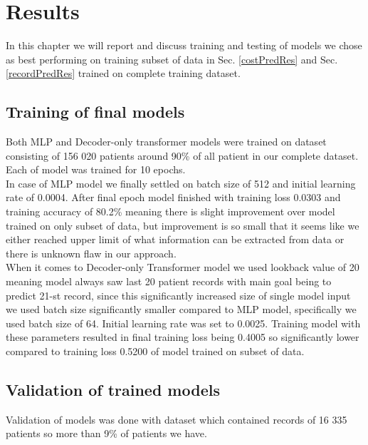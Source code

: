 
\chapter{Results} \label{chap:results}

In this chapter we will report and discuss training and testing of models we chose as best performing on training subset of data in Sec. \ref{costPredRes} and Sec. \ref{recordPredRes} trained on complete training dataset.
\\

\section{Training of final models}
\label{modelTrain}

Both MLP and Decoder-only transformer models were trained on dataset consisting of 156 020 patients around 90\% of all patient in our complete dataset. Each of model was trained for 10 epochs. 
\\

In case of MLP model we finally settled on batch size of 512 and initial learning rate of 0.0004. After final epoch model finished with training loss 0.0303 and training accuracy of 80.2\% meaning there is slight improvement over model trained on only subset of data, but improvement is so small that it seems like we either reached upper limit of what information can be extracted from data or there is unknown flaw in our approach.
\\

When it comes to Decoder-only Transformer model we used lookback value of 20 meaning model always saw last 20 patient records with main goal being to predict 21-st record, since this significantly increased size of single model input we used batch size significantly smaller compared to MLP model, specifically we used batch size of 64. Initial learning rate was set to 0.0025. Training model with these parameters resulted in final training loss being 0.4005 so significantly lower compared to training loss 0.5200 of model trained on subset of data. 


\section{Validation of trained models}
\label{modelValid}

Validation of models was done with dataset which contained records of 16 335 patients so more than 9\% of patients we have.
\\

